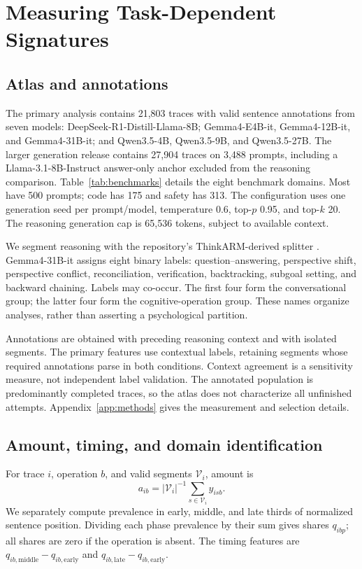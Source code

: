 \section{Measuring Task-Dependent Signatures}
\label{sec:methods}
\subsection{Atlas and annotations}
The primary analysis contains 21,803 traces with valid sentence annotations from seven models: DeepSeek-R1-Distill-Llama-8B; Gemma4-E4B-it, Gemma4-12B-it, and Gemma4-31B-it; and Qwen3.5-4B, Qwen3.5-9B, and Qwen3.5-27B. The larger generation release contains 27,904 traces on 3,488 prompts, including a Llama-3.1-8B-Instruct answer-only anchor excluded from the reasoning comparison. Table~\ref{tab:benchmarks} details the eight benchmark domains. Most have 500 prompts; code has 175 and safety has 313. The configuration uses one generation seed per prompt/model, temperature 0.6, top-$p$ 0.95, and top-$k$ 20. The reasoning generation cap is 65,536 tokens, subject to available context.

We segment reasoning with the repository's ThinkARM-derived splitter \citep{li2025thinkarm}. Gemma4-31B-it assigns eight binary labels: question--answering, perspective shift, perspective conflict, reconciliation, verification, backtracking, subgoal setting, and backward chaining. Labels may co-occur. The first four form the conversational group; the latter four form the cognitive-operation group. These names organize analyses, rather than asserting a psychological partition.

Annotations are obtained with preceding reasoning context and with isolated segments. The primary features use contextual labels, retaining segments whose required annotations parse in both conditions. Context agreement is a sensitivity measure, not independent label validation. The annotated population is predominantly completed traces, so the atlas does not characterize all unfinished attempts. Appendix~\ref{app:methods} gives the measurement and selection details.

\subsection{Amount, timing, and domain identification}
For trace $i$, operation $b$, and valid segments $\mathcal V_i$, amount is
\begin{equation}
a_{ib}=|\mathcal V_i|^{-1}\sum_{s\in\mathcal V_i} y_{isb}.
\end{equation}
We separately compute prevalence in early, middle, and late thirds of normalized sentence position. Dividing each phase prevalence by their sum gives shares $q_{ibp}$; all shares are zero if the operation is absent. The timing features are $q_{ib,\mathrm{middle}}-q_{ib,\mathrm{early}}$ and $q_{ib,\mathrm{late}}-q_{ib,\mathrm{early}}$.

